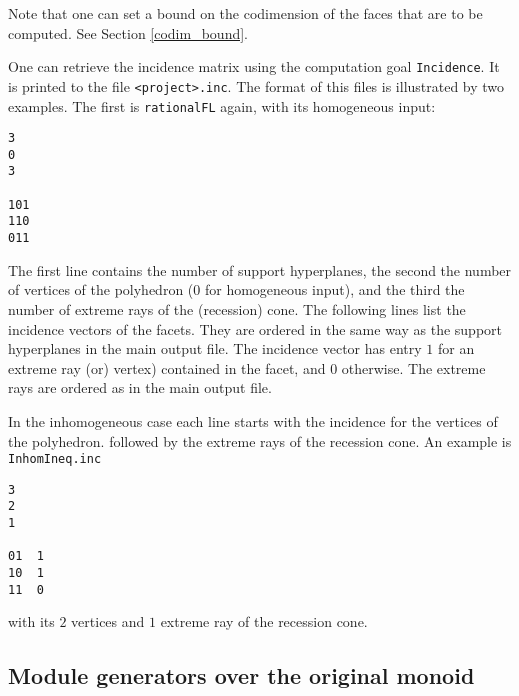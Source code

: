 \documentclass[12pt,a4paper]{scrartcl}
\theoremstyle{definition}
\begin{document}
{Note that one can set a bound on the codimension of the faces that are to be computed. See Section \ref{codim_bound}.

One can retrieve the incidence matrix using the computation goal \verb|Incidence|. It is printed to the file \verb|<project>.inc|. The format of this files is illustrated by two examples. The first is \verb|rationalFL| again, with its homogeneous input:
\begin{Verbatim}
3
0
3

101
110
011
\end{Verbatim}
The first line contains the number of support hyperplanes, the second the number of vertices of the polyhedron ($0$ for homogeneous input), and the third the number of extreme rays of the (recession) cone. The following lines list the incidence vectors of the facets. They are ordered in the same way as the support hyperplanes in the main output file. The incidence vector has entry $1$ for an extreme ray (or) vertex) contained in the facet, and $0$ otherwise. The extreme rays are ordered as in the main output file.

In the inhomogeneous case each line starts with the incidence for the vertices of the polyhedron. followed by the extreme rays of the recession cone. An example is \verb|InhomIneq.inc|
\begin{Verbatim}
3
2
1

01  1
10  1
11  0
\end{Verbatim}
with its $2$ vertices and $1$ extreme ray of the recession cone. 
 
\subsection{Module generators over the original monoid}\label{MinMod}

}
\end{document}
